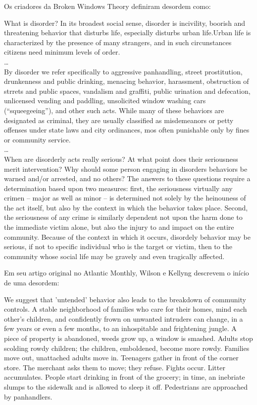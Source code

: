\documentclass[
	12pt,				%
	openright,			%
	twoside,			%
	a4paper,			%
	chapter=TITLE,		%
	section=TITLE,		%
	subsection=TITLE,	%
	subsubsection=TITLE,%
	spanish,            %
	english,			%
	brazil				%
	]{abntex2}
\begin{document}
\par
Os criadores da Broken Windows Theory definiram desordem como:
\begin{citacao}[english]
	What is disorder? In its broadest  social sense, disorder is incivility, boorish and threatening behavior that disturbs life, especially disturbs urban life.Urban life is characterized  by the presence of many strangers, and in such circunstances citizens need minimum
	levels of order.\cite[p. ~14]{Kelling}\\
	\ldots\\
	By disorder we refer specifically to aggressive panhandling, street prostitution, drunkenness and public drinking, menacing behavior,
	harassment, obstruction of strrets and public spaces, vandalism and graffiti, public urination and defecation, unlicensed  vending
	and paddling, unsolicited window washing cars (“squeegeeing”), and other such acts. While many of these behaviors are designated as criminal, they are usually classified as misdemeanors or petty offenses under state laws and city ordinances, mos often punishable only by fines or community service.\cite[p. ~15]{Kelling}\\
	\ldots\\
	When are disorderly acts really serious? At what point does their seriousness merit intervention? Why should some person engaging in disorders behaviors be warned and/or arrested, and no others? The answers to these questions require a determination based upon two measures: first, the seriousness virtually any crimen -- major as well as minor -- is determined not solely by the heinouness of the act itself, but also by the context in which the behavior takes place. Second, the seriousness of any crime is similarly dependent not upon the harm done to the immediate victim alone, but also the injury to and impact on the entire community. Because of the context in which it occurs, disordely behavior may be serious, if not to specific individual who is the target or victim, then to the community whose social life may be gravely and even tragically affected.\cite[p. ~30-31]{Kelling} 
\end{citacao}
Em seu artigo original no Atlantic Monthly, Wilson e Kellyng descrevem o início de uma desordem:
\begin{citacao}[english]
	We suggest that 'untended'  behavior also leads to the breakdown of community controls. A stable
	neighborhood of families who care for their homes, mind each other's children, and confidently frown on
	unwanted intruders can change, in a few years or even a few months, to an inhospitable and frightening
	jungle. A piece of property is abandoned, weeds grow up, a window is smashed. Adults stop scolding
	rowdy children; the children, emboldened, become more rowdy. Families move out, unattached adults
	move in. Teenagers gather in front of the corner store. The merchant asks them to move; they refuse.
	Fights occur. Litter accumulates. People start drinking in front of the grocery; in time, an inebriate slumps
	to the sidewalk and is allowed to sleep it off. Pedestrians are approached by panhandlers.\cite[p. ~3]{Atlantic}
\end{citacao}
\end{document}
